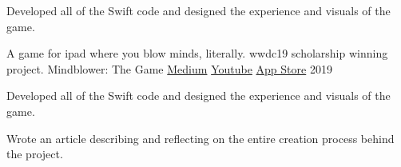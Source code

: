 \begin{cventries}
{\begin{cvitems}
        \item {Developed all of the Swift code and designed the experience and visuals of the game.}
      \end{cvitems}
    }
  \cventry
    {A game for ipad where you blow minds, literally. wwdc19 scholarship winning project.}
    {Mindblower: The Game}
    {\href{https://medium.freecodecamp.org/how-i-won-a-scholarship-to-apples-yearly-event-for-the-second-time-f04f5f4636b1}{Medium} \hspace{4pt} \href{https://www.youtube.com/watch?v=xH9cn7BtG8k}{Youtube} \hspace{4pt} \href{https://itunes.apple.com/us/app/mindblower-the-game/id1460079689}{App Store}} %
    {2019}
    {
      \begin{cvitems}
        \item {Developed all of the Swift code and designed the experience and visuals of the game.}
        \item {Wrote an article describing and reflecting on the entire creation process behind the project.}
      \end{cvitems}
    }
\end{cventries}
